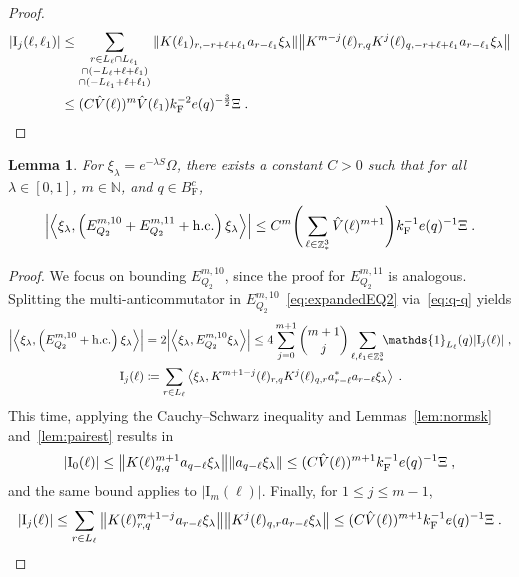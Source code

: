 \documentclass[12pt,a4paper]{article}
\numberwithin{equation}{section}
\newcommand{\NNN}{\mathbb{N}}
\newcommand{\1}{\mathbb{I}}
\newcommand{\F}{\mathrm{F}}
\newcommand{\I}{\mathrm{I}}
\DeclareMathOperator{\Z}{\mathbb{Z}}
\newcommand{\eva}[1]{\left\langle #1 \right\rangle}
\theoremstyle{plain}
\newtheorem{lemma}[theorem]{Lemma}
\theoremstyle{definition}
\theoremstyle{remark}
\theoremstyle{plain}
\theoremstyle{definition}
\theoremstyle{remark}
\begin{document}
\begin{proof}
\begin{align}
	|\I_j(\ell, \ell_1)|
	&\leq \sum_{\substack{r\in L_{\ell} \cap L_{\ell_1}\\\cap (-L_{\ell}+\ell+\ell_1) \\ \cap (-L_{\ell_1}+\ell+\ell_1)}} \norm{ K(\ell_1)_{r,-r+\ell+\ell_1} a_{r-\ell_1} \xi_\lambda} \norm{ K^{m-j}(\ell)_{r,q} K^j(\ell)_{q,-r+\ell+\ell_1} a_{r-\ell_1} \xi_\lambda} \nonumber\\
	&\leq (C \hat{V}(\ell))^m
		\hat{V}(\ell_1)
		k_{\F}^{-2} e(q)^{-\frac 32} \Xi \;. \label{eq:estEQ2182}
\end{align}
\end{proof}


\begin{lemma} \label{lem:EQ212}
For $\xi_\lambda = e^{-\lambda S} \Omega$, there exists a constant $ C > 0 $ such that for all $ \lambda \in [0,1] $, $ m \in \NNN $, and $ q \in B_{\F}^c $,
\begin{equation}
	\abs{\eva{\xi_\lambda,\left(E^{m,10}_{Q_2}+E^{m,11}_{Q_2}+\mathrm{h.c.}\right) \xi_\lambda }}
	\leq C^m \Bigg( \sum_{\ell \in \Z^3_*} \hat{V}(\ell)^{m+1} \Bigg)
		k_{\F}^{-1} e(q)^{-1} \Xi \;. \label{eq:estEQ212}
\end{equation}
\end{lemma}

\begin{proof}
We focus on bounding $ E^{m,10}_{Q_2} $, since the proof for $ E^{m,11}_{Q_2} $ is analogous.
Splitting the multi-anticommutator in $ E^{m,10}_{Q_2} $~\eqref{eq:expandedEQ2} via~\eqref{eq:q-q} yields
\begin{equation} \label{eq:EQ2121}
\begin{aligned}
	\abs{\eva{\xi_\lambda,\left(E^{m,10}_{Q_2}+\mathrm{h.c.}\right) \xi_\lambda }} 
	&= 2\abs{\eva{\xi_\lambda, E^{m,10}_{Q_2} \xi_\lambda }}
	\le 4 \sum_{j=0}^{m+1} {{m+1}\choose j} \sum_{\ell,\ell_1  \in \Z^3_*}\!\! \mathds{1}_{L_\ell}(q) |\I_j(\ell)| \;,\\
	\I_j(\ell)
	&\coloneq \sum_{r\in L_{\ell}}
		\eva{\xi_\lambda, K^{m+1-j}(\ell)_{r,q} K^{j}(\ell)_{q,r} a^*_{r-\ell} a_{r-\ell} \xi_\lambda} \;. \\
\end{aligned}
\end{equation}
This time, applying the Cauchy--Schwarz inequality and Lemmas~\ref{lem:normsk} and~\ref{lem:pairest} results in
\begin{equation}
	|\I_0(\ell)|
	\leq \norm{ K(\ell)^{m+1}_{q,q} a_{q-\ell} \xi_\lambda}\norm{ a_{q-\ell} \xi_\lambda }
	\leq (C \hat{V}(\ell))^{m+1}
		k_{\F}^{-1} e(q)^{-1} \Xi \;,\label{eq:estEQ2121}
\end{equation}
and the same bound applies to $ |\I_m(\ell)| $. Finally, for $ 1 \le j \le m-1 $,
\begin{equation}
	|\I_j(\ell)|
	\leq \sum_{r \in L_{\ell}} \norm{ K(\ell)^{m+1-j}_{r,q} a_{r-\ell}\xi_\lambda}\norm{ K^j(\ell)_{q,r} a_{r-\ell} \xi_\lambda }
	\leq (C \hat{V}(\ell))^{m+1}
		k_{\F}^{-1} e(q)^{-1} \Xi \;. \label{eq:estEQ2122}
\end{equation}
\end{proof}
\end{document}
